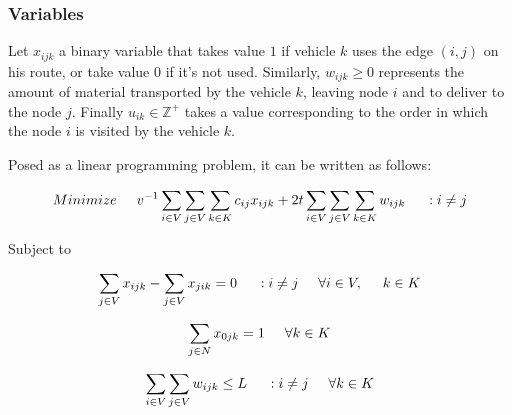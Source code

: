 \documentclass{amsart}
\begin{document}
        \subsubsection{Variables}
        
        
        Let $x_{ijk}$ a binary variable that takes value $1$ if vehicle $k$ uses the edge $(i, j)$ on his route, or take value $0$ if it's not used. Similarly, $w_{ijk} \geq 0$ represents the amount of material transported by the vehicle $k$, leaving node $i$ and to deliver to the node $j$. Finally $u_{ik} \in \mathbb{Z}^+$ takes a value corresponding to the order in which the node $i$ is visited by the vehicle $k$.

        
        \vspace{0.4cm} Posed as a linear programming problem, it can be written as follows:
            
            \begin{equation} \label{eq:1}
                Minimize \hspace{0.5cm} v^{-1} \sum_{i \in V} \sum_{j \in V} \sum_{k \in K} c_{ij} x_{ijk} + 2t \sum_{i \in V} \sum_{j \in V} \sum_{k \in K} w_{ijk} \hspace{0.5cm} : i \neq j
            \end{equation}

        Subject\hspace{0.07cm} to \hspace{0.5cm}
        
        \begin{equation} \label{eq:2}
            \sum_{j \in V} x_{ijk} - \sum_{j \in V} x_{jik} = 0 \hspace{0.5cm} : i \neq j \hspace{0.5cm} \forall i \in V, \hspace{0.5cm} k \in K
        \end{equation}

        
        \begin{equation} \label{eq:3}
            \sum_{j \in N} x_{0jk} = 1 \hspace{0.5cm} \forall k \in K
        \end{equation}

        
        \begin{equation} \label{eq:4}
            \sum_{i \in V} \sum_{j \in V} w_{ijk} \leq L \hspace{0.5cm} : i \neq j \hspace{0.5cm} \forall k \in K
        \end{equation}
\end{document}
